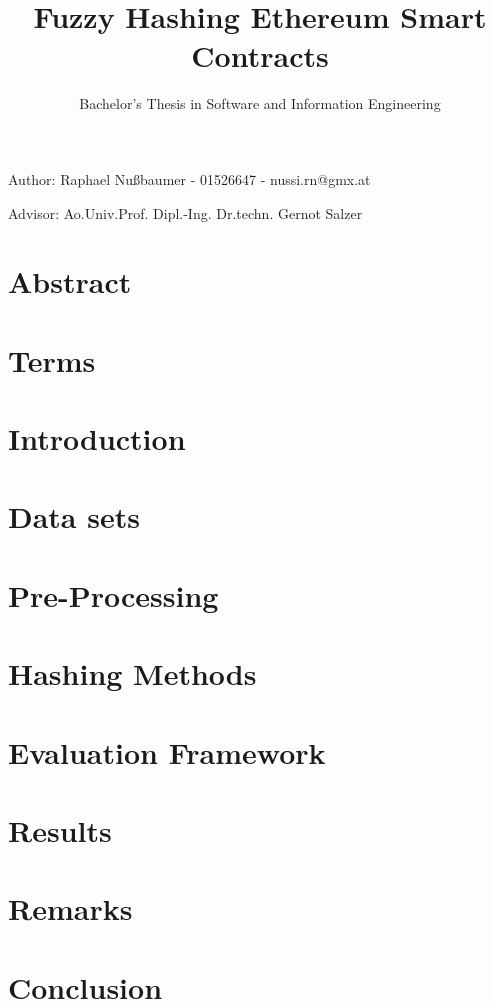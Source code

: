 \documentclass{article}
\title{Fuzzy Hashing Ethereum Smart Contracts}
\author{Bachelor's Thesis in Software and Information Engineering}
\date{}
\begin{document}
\maketitle
Author: Raphael Nußbaumer - 01526647 - nussi.rn@gmx.at

Advisor: Ao.Univ.Prof. Dipl.-Ing. Dr.techn. Gernot Salzer

\section{Abstract}


\section{Terms}


\section{Introduction}


\section{Data sets}


\section{Pre-Processing}


\section{Hashing Methods}


\section{Evaluation Framework}


\section{Results}


\section{Remarks}


\section{Conclusion}


\printbibliography
\end{document}

